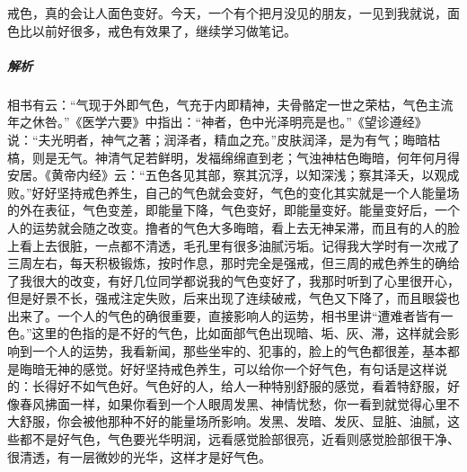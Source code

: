 \begin{case}
    戒色，真的会让人面色变好。今天，一个有个把月没见的朋友，一见到我就说，面色比以前好很多，戒色有效果了，继续学习做笔记。
    \subparagraph{解析} 相书有云：“气现于外即气色，气充于内即精神，夫骨骼定一世之荣枯，气色主流年之休咎。”《医学六要》中指出：“神者，色中光泽明亮是也。”《望诊遵经》说：“夫光明者，神气之著；润泽者，精血之充。”皮肤润泽，是为有气；晦暗枯槁，则是无气。神清气足若鲜明，发福绵绵直到老；气浊神枯色晦暗，何年何月得安居。《黄帝内经》云：“五色各见其部，察其沉浮，以知深浅；察其泽夭，以观成败。”好好坚持戒色养生，自己的气色就会变好，气色的变化其实就是一个人能量场的外在表征，气色变差，即能量下降，气色变好，即能量变好。能量变好后，一个人的运势就会随之改变。撸者的气色大多晦暗，看上去无神呆滞，而且有的人的脸上看上去很脏，一点都不清透，毛孔里有很多油腻污垢。记得我大学时有一次戒了三周左右，每天积极锻炼，按时作息，那时完全是强戒，但三周的戒色养生的确给了我很大的改变，有好几位同学都说我的气色变好了，我那时听到了心里很开心，但是好景不长，强戒注定失败，后来出现了连续破戒，气色又下降了，而且眼袋也出来了。一个人的气色的确很重要，直接影响人的运势，相书里讲“遭难者皆有一色。”这里的色指的是不好的气色，比如面部气色出现暗、垢、灰、滞，这样就会影响到一个人的运势，我看新闻，那些坐牢的、犯事的，脸上的气色都很差，基本都是晦暗无神的感觉。好好坚持戒色养生，可以给你一个好气色，有句话是这样说的：长得好不如气色好。气色好的人，给人一种特别舒服的感觉，看着特舒服，好像春风拂面一样，如果你看到一个人眼周发黑、神情忧愁，你一看到就觉得心里不大舒服，你会被他那种不好的能量场所影响。发黑、发暗、发灰、显脏、油腻，这些都不是好气色，气色要光华明润，远看感觉脸部很亮，近看则感觉脸部很干净、很清透，有一层微妙的光华，这样才是好气色。
\end{case}

